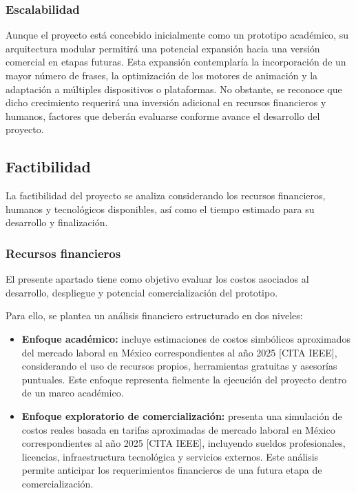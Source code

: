 \subsubsection{Escalabilidad}
Aunque el proyecto está concebido inicialmente como un prototipo académico, su arquitectura modular permitirá una potencial expansión hacia una versión comercial en etapas futuras. Esta expansión contemplaría la incorporación de un mayor número de frases, la optimización de los motores de animación y la adaptación a múltiples dispositivos o plataformas. No obstante, se reconoce que dicho crecimiento requerirá una inversión adicional en recursos financieros y humanos, factores que deberán evaluarse conforme avance el desarrollo del proyecto.

\subsection{Factibilidad}
La factibilidad del proyecto se analiza considerando los recursos financieros, humanos y tecnológicos disponibles, así como el tiempo estimado para su desarrollo y finalización.

\subsubsection{Recursos financieros}
El presente apartado tiene como objetivo evaluar los costos asociados al desarrollo, despliegue y potencial comercialización del prototipo. 

Para ello, se plantea un análisis financiero estructurado en dos niveles: 

\begin{itemize}
	\item \textbf{Enfoque académico:} incluye estimaciones de costos simbólicos aproximados del mercado laboral en México correspondientes al año 2025 [CITA IEEE], considerando el uso de recursos propios, herramientas gratuitas y asesorías puntuales. Este enfoque representa fielmente la ejecución del proyecto dentro de un marco académico.
	
	\item \textbf{Enfoque exploratorio de comercialización:} presenta una simulación de costos reales basada en tarifas aproximadas de mercado laboral en México correspondientes al año 2025 [CITA IEEE], incluyendo sueldos profesionales, licencias, infraestructura tecnológica y servicios externos. Este análisis permite anticipar los requerimientos financieros de una futura etapa de comercialización.
\end{itemize}

